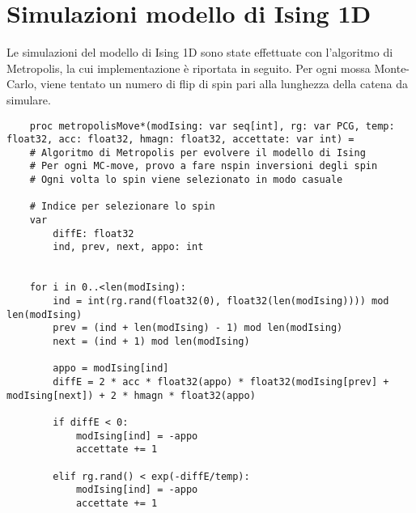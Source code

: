 \section{Simulazioni modello di Ising 1D}

Le simulazioni del modello di Ising 1D sono state effettuate con l'algoritmo di Metropolis, la cui 
implementazione è riportata in seguito. Per ogni mossa Monte-Carlo, viene tentato un numero di flip di 
spin pari alla lunghezza della catena da simulare.

\begin{verbatim}
    proc metropolisMove*(modIsing: var seq[int], rg: var PCG, temp: float32, acc: float32, hmagn: float32, accettate: var int) = 
    # Algoritmo di Metropolis per evolvere il modello di Ising
    # Per ogni MC-move, provo a fare nspin inversioni degli spin
    # Ogni volta lo spin viene selezionato in modo casuale

    # Indice per selezionare lo spin
    var 
        diffE: float32
        ind, prev, next, appo: int


    for i in 0..<len(modIsing):
        ind = int(rg.rand(float32(0), float32(len(modIsing)))) mod len(modIsing)
        prev = (ind + len(modIsing) - 1) mod len(modIsing)
        next = (ind + 1) mod len(modIsing)

        appo = modIsing[ind]
        diffE = 2 * acc * float32(appo) * float32(modIsing[prev] + modIsing[next]) + 2 * hmagn * float32(appo)

        if diffE < 0:
            modIsing[ind] = -appo
            accettate += 1

        elif rg.rand() < exp(-diffE/temp):
            modIsing[ind] = -appo
            accettate += 1
\end{verbatim}   


\newpage

